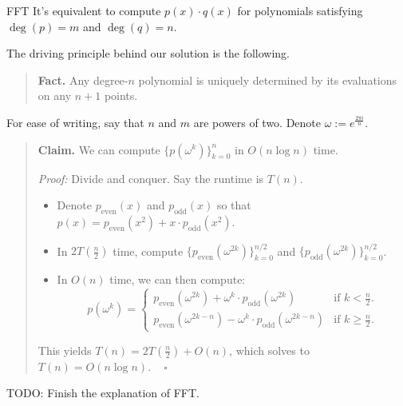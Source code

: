 \begin{solution}{FFT}
    It's equivalent to compute $p(x) \cdot q(x)$ for polynomials satisfying $\deg (p) = m$ and $\deg(q) = n$.

    The driving principle behind our solution is the following.
    \begin{quote}
        \textbf{Fact.} Any degree-$n$ polynomial is uniquely determined by its evaluations on any $n + 1$ points.
    \end{quote}
    For ease of writing, say that $n$ and $m$ are powers of two.  Denote $\omega := e^{\frac{2\pi i}{n}}$.
    \begin{quote}
        \textbf{Claim.} We can compute $\{p(\omega^{k}) \}_{k = 0}^n$ in $O(n \log n)$ time.

        \emph{Proof:} Divide and conquer.  Say the runtime is $T(n)$.
        \begin{itemize}
            \item Denote $p_{\text{even}}(x)$ and $p_{\text{odd}}(x)$ so that $p(x) = p_{\text{even}}(x^2) + x \cdot p_{\text{odd}}(x^2)$.
            \item In $2T\left(\frac{n}{2}\right)$ time, compute $\{p_{\text{even}}(\omega^{2k})\}_{k = 0}^{n / 2}$ and $\{p_{\text{odd}}(\omega^{2k})\}_{k = 0}^{n / 2}$.
            \item In $O(n)$ time, we can then compute:
            \[ p(\omega^k) = \begin{cases}
                p_{\text{even}}\left(\omega^{2k}\right) + \omega^k \cdot p_{\text{odd}}\left(\omega^{2k}\right) & \text{if $k < \frac{n}{2}$.} \\
                p_{\text{even}}\left(\omega^{2k - n}\right) - \omega^k \cdot p_{\text{odd}}\left(\omega^{2k - n}\right) & \text{if $k \geq \frac{n}{2}$.}
            \end{cases} \]
        \end{itemize}
        This yields $T(n) = 2T\left(\frac{n}{2}\right) + O(n)$, which solves to $T(n) = O(n \log n)$. ~ $\square$
    \end{quote}

    TODO: Finish the explanation of FFT.
\end{solution}

